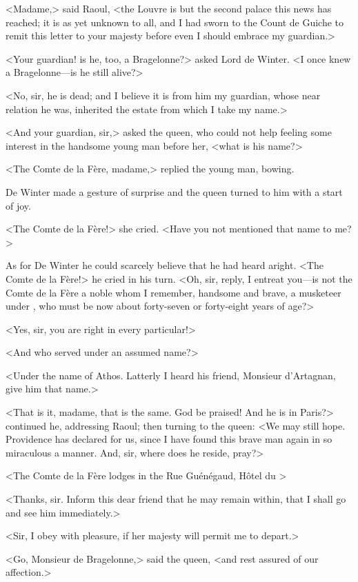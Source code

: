 <Madame,> said Raoul, <the Louvre is but the second palace this news has reached; it is as yet unknown to all, and I had sworn to the Count de Guiche to remit this letter to your majesty before even I should embrace my guardian.>

<Your guardian! is he, too, a Bragelonne?> asked Lord de Winter. <I once knew a Bragelonne—is he still alive?>

<No, sir, he is dead; and I believe it is from him my guardian, whose near relation he was, inherited the estate from which I take my name.>

<And your guardian, sir,> asked the queen, who could not help feeling some interest in the handsome young man before her, <what is his name?>

<The Comte de la Fère, madame,> replied the young man, bowing.

De Winter made a gesture of surprise and the queen turned to him with a start of joy.

<The Comte de la Fère!> she cried. <Have you not mentioned that name to me?>

As for De Winter he could scarcely believe that he had heard aright. <The Comte de la Fère!> he cried in his turn. <Oh, sir, reply, I entreat you—is not the Comte de la Fère a noble whom I remember, handsome and brave, a musketeer under , who must be now about forty-seven or forty-eight years of age?>

<Yes, sir, you are right in every particular!>

<And who served under an assumed name?>

<Under the name of Athos. Latterly I heard his friend, Monsieur d'Artagnan, give him that name.>

<That is it, madame, that is the same. God be praised! And he is in Paris?> continued he, addressing Raoul; then turning to the queen: <We may still hope. Providence has declared for us, since I have found this brave man again in so miraculous a manner. And, sir, where does he reside, pray?>

<The Comte de la Fère lodges in the Rue Guénégaud, Hôtel du >

<Thanks, sir. Inform this dear friend that he may remain within, that I shall go and see him immediately.>

<Sir, I obey with pleasure, if her majesty will permit me to depart.>

<Go, Monsieur de Bragelonne,> said the queen, <and rest assured of our affection.>

